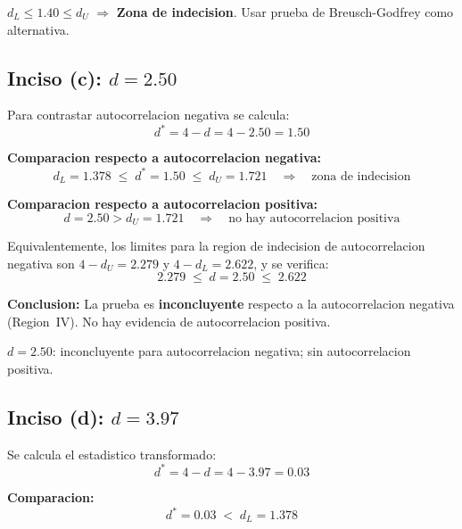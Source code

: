 \documentclass[12pt, letterpaper]{article}
\begin{document}
\begin{clave}
  $d_L \le 1.40 \le d_U$ $\Rightarrow$ \textbf{Zona de indecision}.
  Usar prueba de Breusch-Godfrey como alternativa.
\end{clave}

\subsection{Inciso (c): $d = 2.50$}

Para contrastar autocorrelacion negativa se calcula:
\begin{equation}
  d^* = 4 - d = 4 - 2.50 = 1.50
\end{equation}

\textbf{Comparacion respecto a autocorrelacion negativa:}
\begin{equation}
  d_L = 1.378 \;\le\; d^* = 1.50 \;\le\; d_U = 1.721
  \quad \Rightarrow \quad \text{zona de indecision}
\end{equation}

\textbf{Comparacion respecto a autocorrelacion positiva:}
\begin{equation}
  d = 2.50 > d_U = 1.721
  \quad \Rightarrow \quad \text{no hay autocorrelacion positiva}
\end{equation}

Equivalentemente, los limites para la region de indecision de autocorrelacion
negativa son $4 - d_U = 2.279$ y $4 - d_L = 2.622$, y se verifica:
\begin{equation}
  2.279 \;\le\; d = 2.50 \;\le\; 2.622
\end{equation}

\textbf{Conclusion:} La prueba es \textbf{inconcluyente} respecto a la
autocorrelacion negativa (Region~IV). No hay evidencia de autocorrelacion
positiva.

\begin{clave}
  $d = 2.50$: inconcluyente para autocorrelacion negativa;
  sin autocorrelacion positiva.
\end{clave}

\subsection{Inciso (d): $d = 3.97$}

Se calcula el estadistico transformado:
\begin{equation}
  d^* = 4 - d = 4 - 3.97 = 0.03
\end{equation}

\textbf{Comparacion:}
\begin{equation}
  d^* = 0.03 \;<\; d_L = 1.378
\end{equation}
\end{document}

